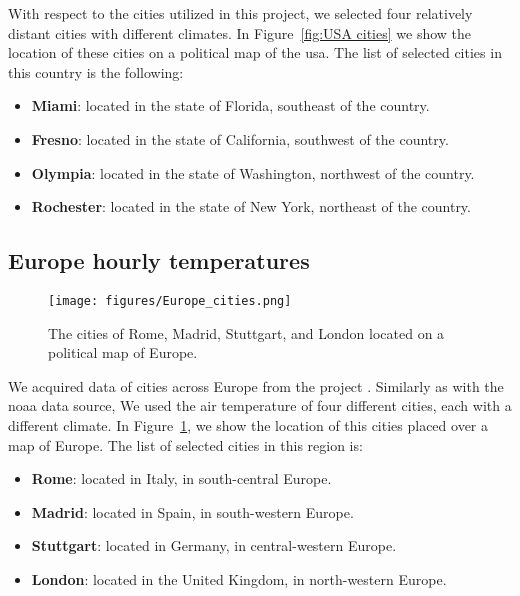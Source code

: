 \documentclass{article}
\begin{document}
With respect to the cities utilized in this project, we selected four relatively distant cities with different climates. In Figure~\ref{fig:USA cities} we show the location of these cities on a political map of the \gls{usa}. The list of selected cities in this country is the following:

\begin{itemize}
    \item \textbf{Miami}: located in the state of Florida, southeast of the country.
    \item \textbf{Fresno}: located in the state of California, southwest of the country.
    \item \textbf{Olympia}: located in the state of Washington, northwest of the country.
    \item \textbf{Rochester}: located in the state of New York, northeast of the country.
\end{itemize}

\subsection{Europe hourly temperatures}
\label{subsec:inspire}

\begin{figure}[ht]
\centering
\texttt{[image: figures/Europe\_cities.png]}
\caption{The cities of Rome, Madrid, Stuttgart, and London located on a political map of Europe.}
\label{fig:Europe cities}
\end{figure}

We acquired data of cities across Europe from the \inspire project \cite{dipasquale_chiara_2019_3256270}. Similarly as with the \gls{noaa} data source, We used the air temperature of four different cities, each with a different climate. In Figure~\ref{fig:Europe cities}, we show the location of this cities placed over a map of Europe. The list of selected cities in this region is: 

\begin{itemize}
    \item \textbf{Rome}: located in Italy, in south-central Europe.
    \item \textbf{Madrid}: located in Spain, in south-western Europe.
    \item \textbf{Stuttgart}: located in Germany, in central-western Europe.
    \item \textbf{London}: located in the United Kingdom, in north-western Europe.
\end{itemize}
\end{document}

